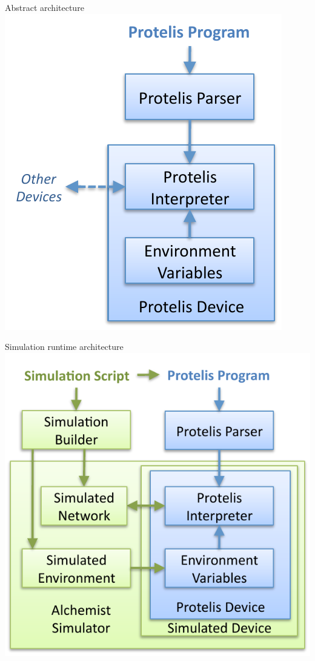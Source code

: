 \documentclass[presentation]{beamer} %
\begin{document}
\begin{frame}{Abstract architecture}
  \centering
  \includegraphics[height=0.8\textheight{}]{imgs/abstract}
\end{frame}

\begin{frame}{Simulation runtime architecture}
  \centering
  \includegraphics[width=0.6\textwidth{}]{imgs/simulated}
\end{frame}
\end{document}
